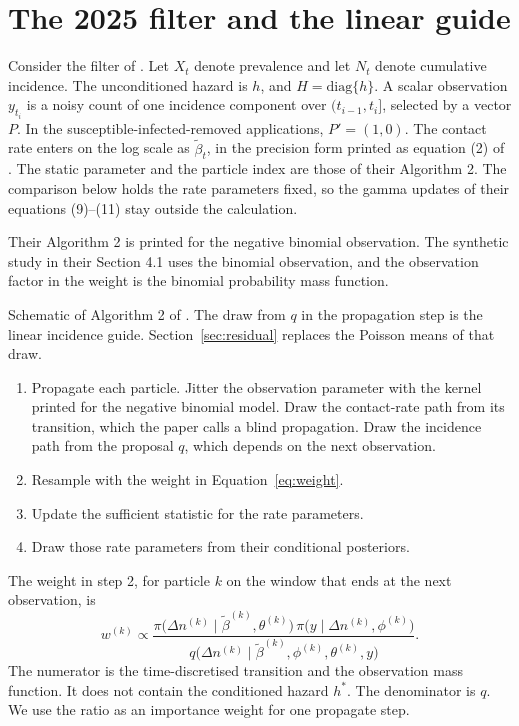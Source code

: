 \section{The 2025 filter and the linear guide}
\label{sec:filter}

Consider the filter of \citet{whitaker2025}. Let \(X_t\) denote prevalence and let \(N_t\) denote cumulative incidence. The unconditioned hazard is \(h\), and \(H = \mathrm{diag}\{h\}\). A scalar observation \(y_{t_i}\) is a noisy count of one incidence component over \((t_{i-1}, t_i]\), selected by a vector \(P\). In the susceptible-infected-removed applications, \(P' = (1, 0)\). The contact rate enters on the log scale as \(\tilde{\beta}_t\), in the precision form printed as equation (2) of \citet{whitaker2025}. The static parameter and the particle index are those of their Algorithm 2. The comparison below holds the rate parameters fixed, so the gamma updates of their equations (9)--(11) stay outside the calculation.

Their Algorithm 2 is printed for the negative binomial observation. The synthetic study in their Section 4.1 uses the binomial observation, and the observation factor in the weight is the binomial probability mass function.

\begin{algbox}
\label{alg:schematic}
Schematic of Algorithm 2 of \citet{whitaker2025}. The draw from \(q\) in the propagation step is the linear incidence guide. Section~\ref{sec:residual} replaces the Poisson means of that draw.
\begin{enumerate}
\item Propagate each particle. Jitter the observation parameter with the kernel printed for the negative binomial model. Draw the contact-rate path from its transition, which the paper calls a blind propagation. Draw the incidence path from the proposal \(q\), which depends on the next observation.
\item Resample with the weight in Equation~\eqref{eq:weight}.
\item Update the sufficient statistic for the rate parameters.
\item Draw those rate parameters from their conditional posteriors.
\end{enumerate}
\end{algbox}

The weight in step 2, for particle \(k\) on the window that ends at the next observation, is
\begin{equation}
\label{eq:weight}
w^{(k)} \propto
\frac{\pi\bigl(\Delta n^{(k)} \mid \tilde{\beta}^{(k)}, \theta^{(k)}\bigr)\,
\pi\bigl(y \mid \Delta n^{(k)}, \phi^{(k)}\bigr)}
{q\bigl(\Delta n^{(k)} \mid \tilde{\beta}^{(k)}, \phi^{(k)}, \theta^{(k)}, y\bigr)}.
\end{equation}
The numerator is the time-discretised transition and the observation mass function. It does not contain the conditioned hazard \(h^{*}\). The denominator is \(q\). We use the ratio as an importance weight for one propagate step.

